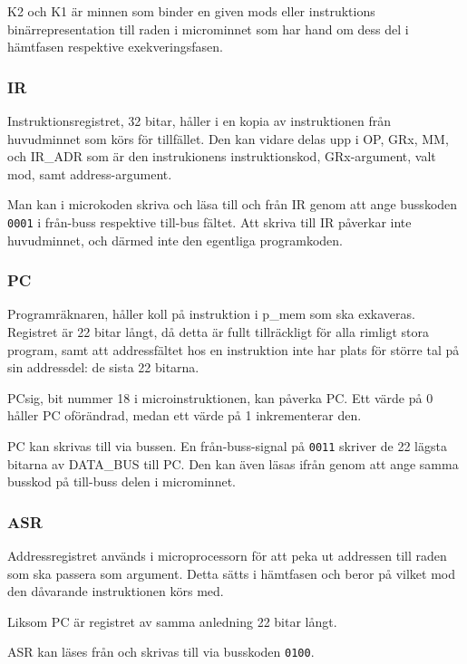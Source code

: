 \documentclass[]{article}
\begin{document}
\noindent
K2 och K1 är minnen som binder en given mods eller instruktions binärrepresentation till raden i microminnet som har hand om dess del i hämtfasen respektive exekveringsfasen.

\subsubsection{IR}

Instruktionsregistret, 32 bitar, håller i en kopia av instruktionen från huvudminnet som körs för tillfället. Den kan vidare delas upp i OP, GRx, MM, och IR\_ADR som är den instrukionens instruktionskod, GRx-argument, valt mod, samt address-argument.

Man kan i microkoden skriva och läsa till och från IR genom att ange busskoden \texttt{0001} i från-buss respektive till-bus fältet. Att skriva till IR påverkar inte huvudminnet, och därmed inte den egentliga programkoden.

\subsubsection{PC}

Programräknaren, håller koll på instruktion i p\_mem som ska exkaveras. Registret är 22 bitar långt, då detta är fullt tillräckligt för alla rimligt stora program, samt att addressfältet hos en instruktion inte har plats för större tal på sin addressdel: de sista 22 bitarna.

PCsig, bit nummer 18 i microinstruktionen, kan påverka PC. Ett värde på 0 håller PC oförändrad, medan ett värde på 1 inkrementerar den.

PC kan skrivas till via bussen. En från-buss-signal på \texttt{0011} skriver de 22 lägsta bitarna av DATA\_BUS till PC. Den kan även läsas ifrån genom att ange samma busskod på till-buss delen i microminnet.

\subsubsection{ASR}

Addressregistret används i microprocessorn för att peka ut addressen till raden som ska passera som argument. Detta sätts i hämtfasen och beror på vilket mod den dåvarande instruktionen körs med.

Liksom PC är registret av samma anledning 22 bitar långt.

ASR kan läses från och skrivas till via busskoden \texttt{0100}.
\end{document}
